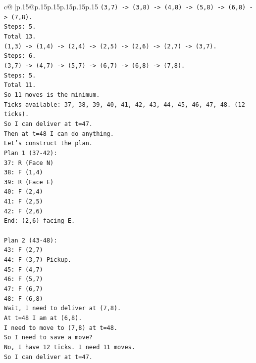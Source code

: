 \documentclass{article}
\begin{document}
{\begin{supertabular}{c@{$\;$}|p{.15\linewidth}@{}p{.15\linewidth}p{.15\linewidth}p{.15\linewidth}p{.15\linewidth}p{.15\linewidth}}
{{{\texttt{(3,7) {-}> (3,8) {-}> (4,8) {-}> (5,8) {-}> (6,8) {-}> (7,8).} \\
\texttt{Steps: 5.} \\
\texttt{Total 13.} \\
\texttt{(1,3) {-}> (1,4) {-}> (2,4) {-}> (2,5) {-}> (2,6) {-}> (2,7) {-}> (3,7).} \\
\texttt{Steps: 6.} \\
\texttt{(3,7) {-}> (4,7) {-}> (5,7) {-}> (6,7) {-}> (6,8) {-}> (7,8).} \\
\texttt{Steps: 5.} \\
\texttt{Total 11.} \\
\texttt{So 11 moves is the minimum.} \\
\texttt{Ticks available: 37, 38, 39, 40, 41, 42, 43, 44, 45, 46, 47, 48. (12 ticks).} \\
\texttt{So I can deliver at t=47.} \\
\texttt{Then at t=48 I can do anything.} \\
\texttt{Let's construct the plan.} \\
\texttt{Plan 1 (37{-}42):} \\
\texttt{37: R (Face N)} \\
\texttt{38: F (1,4)} \\
\texttt{39: R (Face E)} \\
\texttt{40: F (2,4)} \\
\texttt{41: F (2,5)} \\
\texttt{42: F (2,6)} \\
\texttt{End: (2,6) facing E.} \\
\\ 
\texttt{Plan 2 (43{-}48):} \\
\texttt{43: F (2,7)} \\
\texttt{44: F (3,7) Pickup.} \\
\texttt{45: F (4,7)} \\
\texttt{46: F (5,7)} \\
\texttt{47: F (6,7)} \\
\texttt{48: F (6,8)} \\
\texttt{Wait, I need to deliver at (7,8).} \\
\texttt{At t=48 I am at (6,8).} \\
\texttt{I need to move to (7,8) at t=48.} \\
\texttt{So I need to save a move?} \\
\texttt{No, I have 12 ticks. I need 11 moves.} \\
\texttt{So I can deliver at t=47.} \\
}}}
\end{supertabular}}
\end{document}
